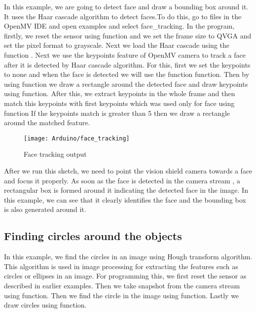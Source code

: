 In this example, we are going to detect face and draw a bounding box around it. It uses the Haar cascade algorithm to detect faces.To do this, go to files in the OpenMV IDE and open examples and select face\_tracking. In the program, firstly, we  reset the sensor using  function and we  set the frame size to QVGA and set the pixel format to grayscale. Next we  load the Haar cascade using the function  . Next we  use the keypoints feature of OpenMV camera to track a face after it is detected by Haar cascade algorithm. For this, first we set the keypoints to none and when the face is detected we will use the function  function. Then by using  function we draw a rectangle around the detected face and draw keypoints using  function. After this, we extract keypoints in the whole frame and then match this keypoints with first keypoints which was used only for face using  function If the keypoints match is greater than 5 then we draw a rectangle around the matched feature.

\begin{figure}[H]
	\centering
	\texttt{[image: Arduino/face\_tracking]}
	\caption{Face tracking output}
	\label{figure 6.11}
\end{figure}

After we run this sketch, we need to point the vision shield camera towards a face and focus it properly. As soon as the face is detected in the camera stream , a rectangular box is formed around it indicating the detected face in the image. In this example, we can see that it clearly identifies the face and the bounding box is also generated around it.

\subsection{Finding circles around the objects}

In this example, we find the circles in an image using Hough transform algorithm. This algorithm is used in image processing for extracting the features such as circles or ellipses in an image.  For programming this,  we first reset the sensor as described in earlier examples. Then we take snapshot from the camera stream using  function. Then we find the circle in the image using   function. Lastly  we draw circles using  function.

